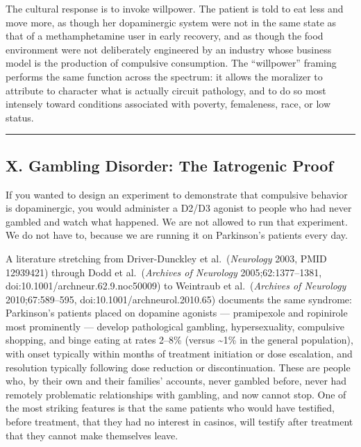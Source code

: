 The cultural response is to invoke willpower. The patient is told to eat less and move more, as though her dopaminergic system were not in the same state as that of a methamphetamine user in early recovery, and as though the food environment were not deliberately engineered by an industry whose business model is the production of compulsive consumption. The ``willpower'' framing performs the same function across the spectrum: it allows the moralizer to attribute to character what is actually circuit pathology, and to do so most intensely toward conditions associated with poverty, femaleness, race, or low status.

\begin{center}\rule{0.5\linewidth}{0.5pt}\end{center}

\subsection{X. Gambling Disorder: The Iatrogenic Proof}\label{09_dopamine_spectrum-x.-gambling-disorder-the-iatrogenic-proof}

If you wanted to design an experiment to demonstrate that compulsive behavior is dopaminergic, you would administer a D2/D3 agonist to people who had never gambled and watch what happened. We are not allowed to run that experiment. We do not have to, because we are running it on Parkinson's patients every day.

A literature stretching from Driver-Dunckley et al.~(\emph{Neurology} 2003, PMID 12939421) through Dodd et al.~(\emph{Archives of Neurology} 2005;62:1377--1381, doi:10.1001/archneur.62.9.noc50009) to Weintraub et al.~(\emph{Archives of Neurology} 2010;67:589--595, doi:10.1001/archneurol.2010.65) documents the same syndrome: Parkinson's patients placed on dopamine agonists --- pramipexole and ropinirole most prominently --- develop pathological gambling, hypersexuality, compulsive shopping, and binge eating at rates 2--8\% (versus \textasciitilde1\% in the general population), with onset typically within months of treatment initiation or dose escalation, and resolution typically following dose reduction or discontinuation. These are people who, by their own and their families' accounts, never gambled before, never had remotely problematic relationships with gambling, and now cannot stop. One of the most striking features is that the same patients who would have testified, before treatment, that they had no interest in casinos, will testify after treatment that they cannot make themselves leave.

